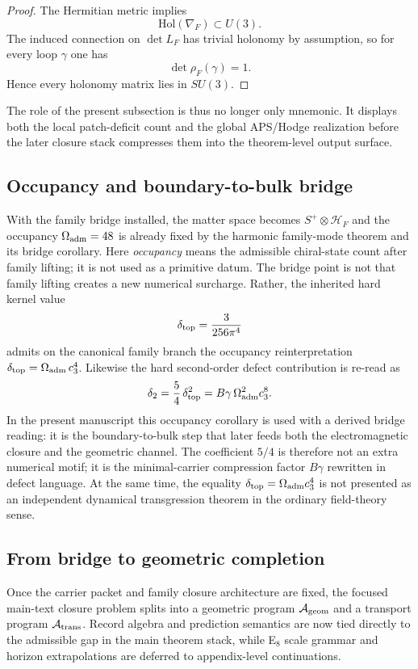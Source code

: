 \begin{proof}
The Hermitian metric implies
\[
\mathrm{Hol}(\nabla_F)\subset U(3).
\]
The induced connection on $\det L_F$ has trivial holonomy by assumption, so for
every loop $\gamma$ one has
\[
\det \rho_F(\gamma)=1.
\]
Hence every holonomy matrix lies in $SU(3)$.
\end{proof}

The role of the present subsection is thus no longer only mnemonic. It displays both the local patch-deficit count and the global APS/Hodge realization before the later closure stack compresses them into the theorem-level output surface.

\subsection{Occupancy and boundary-to-bulk bridge}

With the family bridge installed, the matter space becomes $S^+\otimes \mathcal H_F$ and the
occupancy $\Omega_{\mathrm{adm}}=48$ is already fixed by the harmonic family-mode theorem and its bridge
corollary. Here \emph{occupancy} means the admissible chiral-state count after family lifting; it
is not used as a primitive datum. The bridge point is not that family lifting creates a new
numerical surcharge. Rather, the inherited hard kernel value
\[
\delta_{\mathrm{top}}=\frac{3}{256\pi^4}
\]
admits on the canonical family branch the occupancy reinterpretation $\delta_{\mathrm{top}}=\Omega_{\mathrm{adm}}\,c_3^4$.
Likewise the hard second-order defect contribution is re-read as
\[
\delta_2=\frac54\,\delta_{\mathrm{top}}^2=B\gamma\,\Omega_{\mathrm{adm}}^2c_3^8.
\]
In the present manuscript this occupancy corollary is used with a derived bridge reading:
it is the boundary-to-bulk step that later feeds both the electromagnetic closure and the
geometric channel. The coefficient $5/4$ is therefore not an extra numerical motif; it is the
minimal-carrier compression factor $B\gamma$ rewritten in defect language. At the same time, the
equality $\delta_{\mathrm{top}}=\Omega_{\mathrm{adm}}c_3^4$ is not presented as an independent dynamical transgression
theorem in the ordinary field-theory sense.

\subsection{From bridge to geometric completion}

\begin{principle}
Once the carrier packet and family closure architecture are fixed, the focused main-text closure
problem splits into a geometric program $\mathcal A_{\mathrm{geom}}$ and a transport program $\mathcal A_{\mathrm{trans}}$. Record
algebra and prediction semantics are now tied directly to the admissible gap in the main theorem
stack, while E$_8$ scale grammar and horizon extrapolations are deferred to appendix-level
continuations.
\end{principle}

